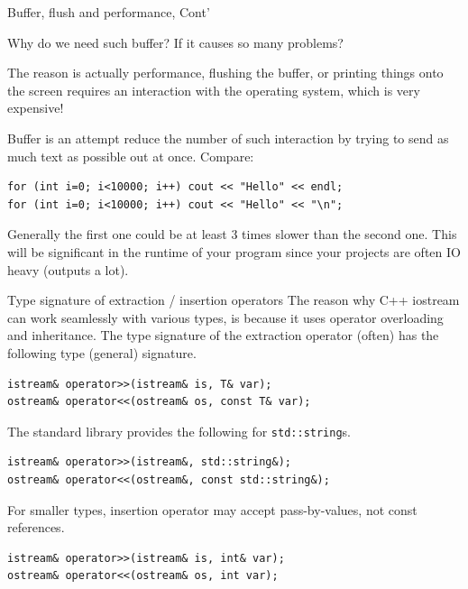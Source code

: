 \begin{frame}[fragile]{Buffer, flush and performance, Cont'}

Why do we need such buffer? If it causes so many problems? 

The reason is actually performance, flushing the buffer, or printing things onto the screen requires an interaction with the operating system, which is very expensive!

Buffer is an attempt reduce the number of such interaction by trying to send as much text as possible out at once. Compare:

\begin{verbatim}
for (int i=0; i<10000; i++) cout << "Hello" << endl;
for (int i=0; i<10000; i++) cout << "Hello" << "\n";
\end{verbatim}

Generally the first one could be at least 3 times slower than the second one. This will be significant in the runtime of your program since your projects are often IO heavy (outputs a lot).
\end{frame}

\begin{frame}[fragile]{Type signature of extraction / insertion operators}
The reason why C++ iostream can work seamlessly with various types, is because it uses operator overloading and inheritance. The type signature of the extraction operator (often) has the following type (general) signature.

\begin{verbatim}
istream& operator>>(istream& is, T& var); 
ostream& operator<<(ostream& os, const T& var);  
\end{verbatim}

The standard library provides the following for \texttt{std::string}s. 
\begin{verbatim}
istream& operator>>(istream&, std::string&); 
ostream& operator<<(ostream&, const std::string&);
\end{verbatim}

For smaller types, insertion operator may accept pass-by-values, not const references.
\begin{verbatim}
istream& operator>>(istream& is, int& var); 
ostream& operator<<(ostream& os, int var);
\end{verbatim}


\end{frame}

